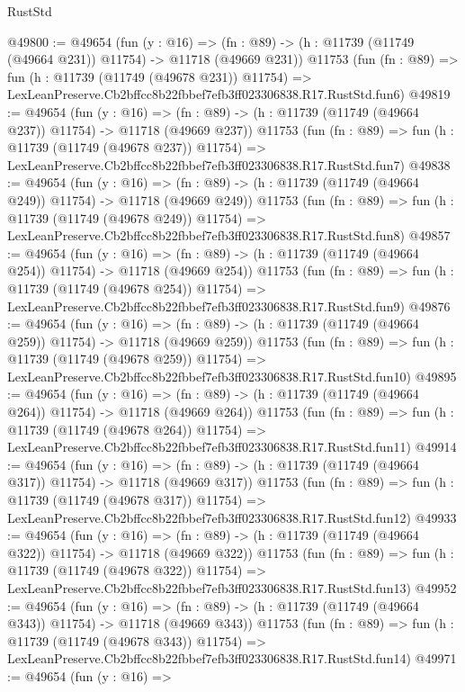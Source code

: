 \begin{lexlean}{RustStd}
\begin{coremodule}
@49800 := @49654
    (fun (y : @16) =>
    (fn : @89) -> (h : @11739 (@11749 (@49664 @231)) @11754) -> @11718 (@49669 @231))
    @11753
    (fun (fn : @89) =>
    fun (h : @11739 (@11749 (@49678 @231)) @11754) =>
    LexLeanPreserve.Cb2bffcc8b22fbbef7efb3ff023306838.R17.RustStd.fun6)
@49819 := @49654
    (fun (y : @16) =>
    (fn : @89) -> (h : @11739 (@11749 (@49664 @237)) @11754) -> @11718 (@49669 @237))
    @11753
    (fun (fn : @89) =>
    fun (h : @11739 (@11749 (@49678 @237)) @11754) =>
    LexLeanPreserve.Cb2bffcc8b22fbbef7efb3ff023306838.R17.RustStd.fun7)
@49838 := @49654
    (fun (y : @16) =>
    (fn : @89) -> (h : @11739 (@11749 (@49664 @249)) @11754) -> @11718 (@49669 @249))
    @11753
    (fun (fn : @89) =>
    fun (h : @11739 (@11749 (@49678 @249)) @11754) =>
    LexLeanPreserve.Cb2bffcc8b22fbbef7efb3ff023306838.R17.RustStd.fun8)
@49857 := @49654
    (fun (y : @16) =>
    (fn : @89) -> (h : @11739 (@11749 (@49664 @254)) @11754) -> @11718 (@49669 @254))
    @11753
    (fun (fn : @89) =>
    fun (h : @11739 (@11749 (@49678 @254)) @11754) =>
    LexLeanPreserve.Cb2bffcc8b22fbbef7efb3ff023306838.R17.RustStd.fun9)
@49876 := @49654
    (fun (y : @16) =>
    (fn : @89) -> (h : @11739 (@11749 (@49664 @259)) @11754) -> @11718 (@49669 @259))
    @11753
    (fun (fn : @89) =>
    fun (h : @11739 (@11749 (@49678 @259)) @11754) =>
    LexLeanPreserve.Cb2bffcc8b22fbbef7efb3ff023306838.R17.RustStd.fun10)
@49895 := @49654
    (fun (y : @16) =>
    (fn : @89) -> (h : @11739 (@11749 (@49664 @264)) @11754) -> @11718 (@49669 @264))
    @11753
    (fun (fn : @89) =>
    fun (h : @11739 (@11749 (@49678 @264)) @11754) =>
    LexLeanPreserve.Cb2bffcc8b22fbbef7efb3ff023306838.R17.RustStd.fun11)
@49914 := @49654
    (fun (y : @16) =>
    (fn : @89) -> (h : @11739 (@11749 (@49664 @317)) @11754) -> @11718 (@49669 @317))
    @11753
    (fun (fn : @89) =>
    fun (h : @11739 (@11749 (@49678 @317)) @11754) =>
    LexLeanPreserve.Cb2bffcc8b22fbbef7efb3ff023306838.R17.RustStd.fun12)
@49933 := @49654
    (fun (y : @16) =>
    (fn : @89) -> (h : @11739 (@11749 (@49664 @322)) @11754) -> @11718 (@49669 @322))
    @11753
    (fun (fn : @89) =>
    fun (h : @11739 (@11749 (@49678 @322)) @11754) =>
    LexLeanPreserve.Cb2bffcc8b22fbbef7efb3ff023306838.R17.RustStd.fun13)
@49952 := @49654
    (fun (y : @16) =>
    (fn : @89) -> (h : @11739 (@11749 (@49664 @343)) @11754) -> @11718 (@49669 @343))
    @11753
    (fun (fn : @89) =>
    fun (h : @11739 (@11749 (@49678 @343)) @11754) =>
    LexLeanPreserve.Cb2bffcc8b22fbbef7efb3ff023306838.R17.RustStd.fun14)
@49971 := @49654
    (fun (y : @16) =>

\end{coremodule}
\end{lexlean}
